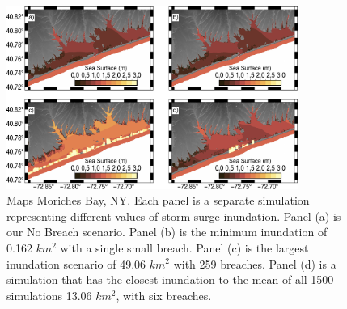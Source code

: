 \documentclass{coastal_paper}
\begin{document}
\begin{figure}
    \centering
    \includegraphics[width=0.85\textwidth]{figures/fig6_v2.pdf}

    \caption{Maps Moriches Bay, NY. Each panel is a separate simulation representing different values of storm surge inundation. Panel (a) is our No Breach scenario. Panel (b) is the minimum inundation of 0.162 $km^2$ with a single small breach. Panel (c) is the largest inundation scenario of 49.06 $km^2$ with 259 breaches. Panel (d)  is a simulation that has the closest inundation to the mean of all 1500 simulations 13.06 $km^2$, with six breaches.}
    \label{fig:6}
\end{figure}
\end{document}

